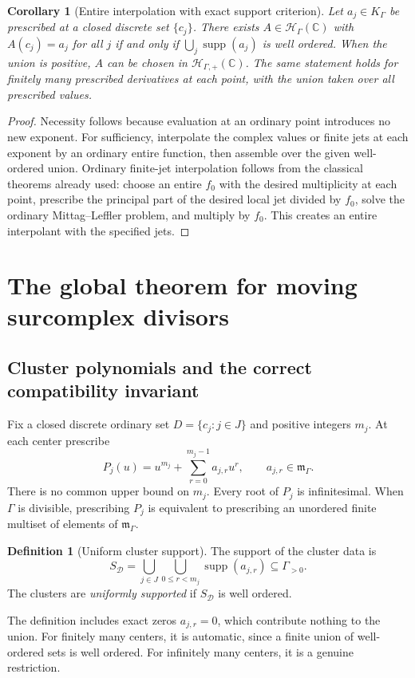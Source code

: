\documentclass[11pt,letterpaper]{article}
\newtheorem{corollary}[corollary]{Corollary}
\theoremstyle{definition}
\newtheorem{definition}[definition]{Definition}
\theoremstyle{remark}
\newcommand{\C}{\mathbb C}
\newcommand{\HH}{\mathscr H_\Gamma}
\newcommand{\HP}{\mathscr H_{\Gamma,+}}
\newcommand{\KK}{K_\Gamma}
\newcommand{\mm}{\mathfrak m_\Gamma}
\newcommand{\supp}{\operatorname{supp}}
\numberwithin{equation}{section}
\begin{document}
\begin{corollary}[Entire interpolation with exact support criterion]\label{cor:interp}
Let $a_j\in\KK$ be prescribed at a closed discrete set $\{c_j\}$. There exists $A\in\HH(\C)$ with $A(c_j)=a_j$ for all $j$ if and only if $\bigcup_j\supp(a_j)$ is well ordered. When the union is positive, $A$ can be chosen in $\HP(\C)$. The same statement holds for finitely many prescribed derivatives at each point, with the union taken over all prescribed values.
\end{corollary}
\begin{proof}
Necessity follows because evaluation at an ordinary point introduces no new exponent. For sufficiency, interpolate the complex values or finite jets at each exponent by an ordinary entire function, then assemble over the given well-ordered union. Ordinary finite-jet interpolation follows from the classical theorems already used: choose an entire $f_0$ with the desired multiplicity at each point, prescribe the principal part of the desired local jet divided by $f_0$, solve the ordinary Mittag--Leffler problem, and multiply by $f_0$. This creates an entire interpolant with the specified jets.
\end{proof}

\section{The global theorem for moving surcomplex divisors}\label{sec:divisors}
\subsection{Cluster polynomials and the correct compatibility invariant}
Fix a closed discrete ordinary set $D=\{c_j:j\in J\}$ and positive integers $m_j$. At each center prescribe
\begin{equation}\label{eq:clusters}
 P_j(u)=u^{m_j}+\sum_{r=0}^{m_j-1}a_{j,r}u^r,
 \qquad a_{j,r}\in\mm.
\end{equation}
There is no common upper bound on $m_j$. Every root of $P_j$ is infinitesimal. When $\Gamma$ is divisible, prescribing $P_j$ is equivalent to prescribing an unordered finite multiset of elements of $\mm$.

\begin{definition}[Uniform cluster support]
The support of the cluster data is
\begin{equation}\label{eq:SD}
 S_{\mathcal D}=\bigcup_{j\in J}\bigcup_{0\le r<m_j}\supp(a_{j,r})
 \subseteq\Gamma_{>0}.
\end{equation}
The clusters are \emph{uniformly supported} if $S_{\mathcal D}$ is well ordered.
\end{definition}
The definition includes exact zeros $a_{j,r}=0$, which contribute nothing to the union. For finitely many centers, it is automatic, since a finite union of well-ordered sets is well ordered. For infinitely many centers, it is a genuine restriction.
\end{document}
